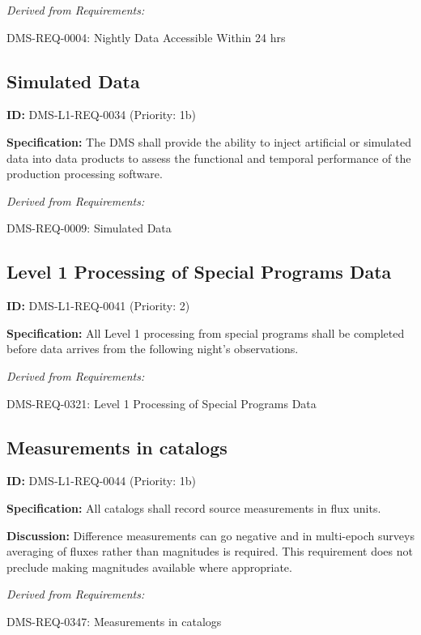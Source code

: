 \documentclass[SE,toc,lsstdraft]{lsstdoc}
\begin{document}
\emph{Derived from Requirements:}

DMS-REQ-0004:
Nightly Data Accessible Within 24 hrs \newline

\subsection{Simulated Data}

\label{DMS-L1-REQ-0034}
\textbf{ID:} DMS-L1-REQ-0034 (Priority: 1b)

\textbf{Specification:} The DMS shall provide the ability to inject artificial or simulated data into data products to assess the functional and temporal performance of the production processing software.

\emph{Derived from Requirements:}

DMS-REQ-0009:
Simulated Data \newline

\subsection{Level 1 Processing of Special Programs Data}

\label{DMS-L1-REQ-0041}
\textbf{ID:} DMS-L1-REQ-0041 (Priority: 2)

\textbf{Specification:} All Level 1 processing from special programs shall be completed before data arrives from the following night's observations.

\emph{Derived from Requirements:}

DMS-REQ-0321:
Level 1 Processing of Special Programs Data \newline

\subsection{Measurements in catalogs}

\label{DMS-L1-REQ-0044}
\textbf{ID:} DMS-L1-REQ-0044 (Priority: 1b)

\textbf{Specification: }All catalogs shall record source measurements in flux units.

\textbf{Discussion: }Difference measurements can go negative and in multi-epoch surveys averaging of fluxes rather than magnitudes is required. This requirement does not preclude making magnitudes available where appropriate.

\emph{Derived from Requirements:}

DMS-REQ-0347:
Measurements in catalogs \newline
\end{document}
